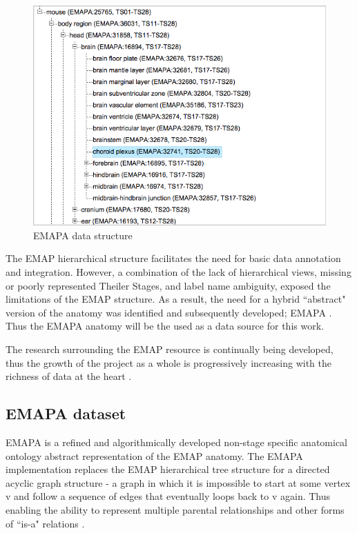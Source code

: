\begin{figure}[H]\begin{center}\includegraphics[width=1\linewidth]{images/emapachoroidplexus}\caption{EMAPA data structure}\label{fig:emapa}\end{center}\end{figure}

The EMAP hierarchical structure facilitates the need for basic data annotation and integration. However, a combination of the lack of hierarchical views, missing or poorly represented Theiler Stages, and label name ambiguity, exposed the limitations of the EMAP structure. As a result, the need for a hybrid ``abstract" version of the anatomy was identified and subsequently developed; EMAPA \cite{emap}. Thus the EMAPA anatomy will be the used as a data source for this work.

The research surrounding the EMAP resource is continually being developed, thus the growth of the project as a whole is progressively increasing with the richness of data at the heart \cite{emap}.

\subsection{EMAPA dataset}\label{emapaanatomy}
EMAPA is a refined and algorithmically developed non-stage specific anatomical ontology abstract representation of the EMAP anatomy. The EMAPA implementation replaces the EMAP hierarchical tree structure for a directed acyclic graph structure - a graph in which it is impossible to start at some vertex v and follow a sequence of edges that eventually loops back to v again. Thus enabling the ability to represent multiple parental relationships and other forms of ``is-a" relations \cite{emap}.

